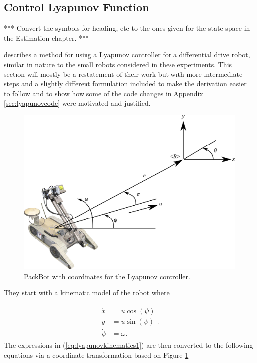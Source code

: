 \subsection{Control Lyapunov Function}
\label{sec:controllyapunov}
*** Convert the symbols for heading, etc to the ones given for the state space in the Estimation chapter. ***

\cite{Rusu05RobotuxLyapunov,Aicardi_UnicycleLyapunov95} describes a method for using a Lyapunov controller for a differential drive robot, similar in nature to the small robots considered in these experiments. This section will mostly be a restatement of their work but with more intermediate steps and a slightly different formulation included to make the derivation easier to follow and to show how some of the code changes in Appendix \ref{sec:lyapunovcode} were motivated and justified.

\begin{figure}[ht!]
	\centering
	\includegraphics[width=.75\textwidth]{images/packbotlyapunov}
	\caption{PackBot with coordinates for the Lyapunov controller.}
	\label{fig:pblyapunov}
\end{figure}

They start with a kinematic model of the robot where

\begin{align}
\label{eq:lyapunovkinematics1}
\begin{split}
\dot{x} &= u\cos(\psi) \\
\dot{y} &= u\sin(\psi) \\
\dot{\psi} &= \omega.
\end{split}.
\end{align}
The expressions in (\ref{eq:lyapunovkinematics1}) are then converted to the following equations via a coordinate transformation based on Figure \ref{fig:pblyapunov}

